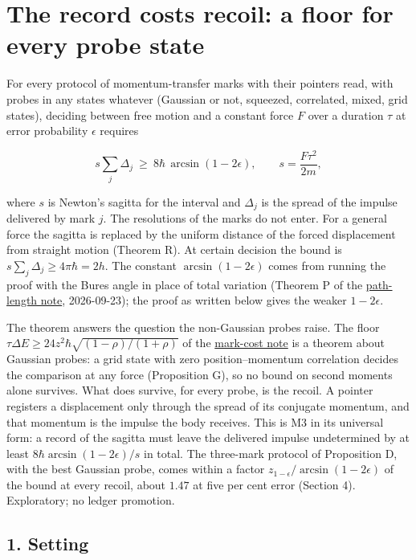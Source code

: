 \documentclass[11pt,a4paper]{article}
\begin{document}
\hypertarget{the-record-costs-recoil-a-floor-for-every-probe-state}{%
\section{The record costs recoil: a floor for every probe
state}\label{the-record-costs-recoil-a-floor-for-every-probe-state}}

For every protocol of momentum-transfer marks with their pointers read,
with probes in any states whatever (Gaussian or not, squeezed,
correlated, mixed, grid states), deciding between free motion and a
constant force \(F\) over a duration \(\tau\) at error probability
\(\epsilon\) requires

\[\boxed{\;s\sum_j\Delta_j\ \ge\ 8\hbar\,\arcsin(1-2\epsilon),\qquad s=\frac{F\tau^2}{2m},\;}\]

where \(s\) is Newton's sagitta for the interval and \(\Delta_j\) is the
spread of the impulse delivered by mark \(j\). The resolutions of the
marks do not enter. For a general force the sagitta is replaced by the
uniform distance of the forced displacement from straight motion
(Theorem R). At certain decision the bound is
\(s\sum_j\Delta_j\ge4\pi\hbar=2h\). The constant
\(\arcsin(1-2\epsilon)\) comes from running the proof with the Bures
angle in place of total variation (Theorem P of the
\href{record-distance-path-length.md}{path-length note}, 2026-09-23);
the proof as written below gives the weaker \(1-2\epsilon\).

The theorem answers the question the non-Gaussian probes raise. The
floor \(\tau\Delta E\ge24z^2\hbar\sqrt{(1-\rho)/(1+\rho)}\) of the
\href{mark-cost-and-statistical-floor.md}{mark-cost note} is a theorem
about Gaussian probes: a grid state with zero position--momentum
correlation decides the comparison at any force (Proposition G), so no
bound on second moments alone survives. What does survive, for every
probe, is the recoil. A pointer registers a displacement only through
the spread of its conjugate momentum, and that momentum is the impulse
the body receives. This is M3 in its universal form: a record of the
sagitta must leave the delivered impulse undetermined by at least
\(8\hbar\arcsin(1-2\epsilon)/s\) in total. The three-mark protocol of
Proposition D, with the best Gaussian probe, comes within a factor
\(z_{1-\epsilon}/\arcsin(1-2\epsilon)\) of the bound at every recoil,
about \(1.47\) at five per cent error (Section 4). Exploratory; no
ledger promotion.

\hypertarget{setting}{%
\subsection{1. Setting}\label{setting}}
\end{document}
